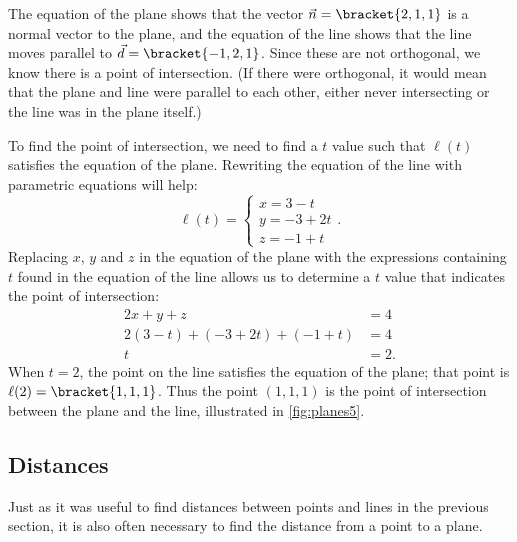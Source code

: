 {The equation of the plane shows that the vector $\vec n =\bracket{2,1,1}$ is a normal vector to the plane, and the equation of the line shows that the line moves parallel to $\vec d =\bracket{-1,2,1}$. Since these are not orthogonal, we know there is a point of intersection. (If there were orthogonal, it would mean that the plane and line were parallel to each other, either never intersecting or the line was in the plane itself.)

To find the point of intersection, we need to find a $t$ value such that $\ell(t)$ satisfies the equation of the plane. Rewriting the equation of the line with parametric equations will help:
\[\ell(t) = \begin{cases}x=3-t\\y=-3+2t\\z=-1+t\end{cases}.\]%
%
Replacing $x$, $y$ and $z$ in the equation of the plane with the expressions containing $t$ found in the equation of the line allows us to determine a $t$ value that indicates the point of intersection:
\begin{align*}
2x+y+z &=4 \\
2(3-t) + (-3+2t) + (-1+t) &= 4 \\
t&=2.
\end{align*}
When $t=2$, the point on the line satisfies the equation of the plane; that point is $\ell(2) =\bracket{1,1,1}$. Thus the point $(1,1,1)$ is the point of intersection between the plane and the line, illustrated in \autoref{fig:planes5}.}

\subsection*{Distances}

Just as it was useful to find distances between points and lines in the previous section, it is also often necessary to find the distance from a point to a plane.

